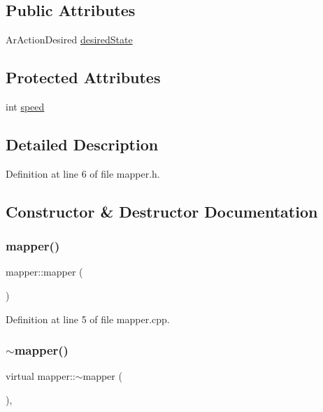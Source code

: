 \subsection*{Public Attributes}
\begin{DoxyCompactItemize}
\item 
Ar\+Action\+Desired \hyperlink{classmapper_ad12cf719b7ef6c4399ca718cdc9f270d}{desired\+State}
\end{DoxyCompactItemize}
\subsection*{Protected Attributes}
\begin{DoxyCompactItemize}
\item 
int \hyperlink{classmapper_a2764f9fead6392132485f3545c18b629}{speed}
\end{DoxyCompactItemize}


\subsection{Detailed Description}


Definition at line 6 of file mapper.\+h.



\subsection{Constructor \& Destructor Documentation}
\mbox{\label{classmapper_a63253379db55193ffc58434c32657270}} 
\subsubsection{\texorpdfstring{mapper()}{mapper()}}
{\footnotesize\ttfamily mapper\+::mapper (\begin{DoxyParamCaption}{ }\end{DoxyParamCaption})}



Definition at line 5 of file mapper.\+cpp.

\mbox{\label{classmapper_aab426a3eb8681cf2c1137f658a6802a4}} 
\subsubsection{\texorpdfstring{$\sim$mapper()}{~mapper()}}
{\footnotesize\ttfamily virtual mapper\+::$\sim$mapper (\begin{DoxyParamCaption}{ }\end{DoxyParamCaption})\hspace{0.3cm}{\ttfamily [inline]}, {\ttfamily [virtual]}}



